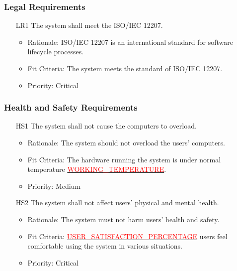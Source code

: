 \documentclass[12pt]{article}
\begin{document}
\subsubsection{Legal Requirements}
\begin{itemize}
    \item[LR1] The system shall meet the ISO/IEC 12207. \label{LR1}
    \begin{itemize}
        \item Rationale: ISO/IEC 12207 is an international standard for software lifecycle processes.
        \item Fit Criteria: The system meets the standard of ISO/IEC 12207.
        \item Priority: Critical
    \end{itemize}
\end{itemize}
\subsubsection{Health and Safety Requirements}
\begin{itemize}
    \item[HS1] The system shall not cause the computers to overload. \label{HS1}
    \begin{itemize}
        \item Rationale: The system should not overload the users’ computers.
        \item Fit Criteria: The hardware running the system is under normal temperature \hyperref[sec:symbolic-constants]{\textcolor{red}{WORKING\_TEMPERATURE}}.
        \item Priority: Medium
    \end{itemize}
\end{itemize}
\begin{itemize}
    \item[HS2] The system shall not affect users’ physical and mental health. \label{HS2}
    \begin{itemize}
        \item Rationale: The system must not harm users’ health and safety.
        \item Fit Criteria: \hyperref[sec:symbolic-constants]{\textcolor{red}{USER\_SATISFACTION\_PERCENTAGE}} users feel comfortable using the system in various situations.
        \item Priority: Critical
    \end{itemize}
\end{itemize}
\end{document}
